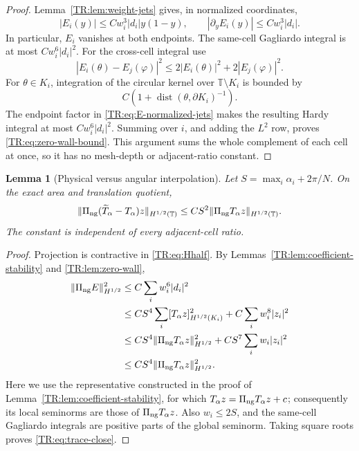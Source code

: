 \documentclass[11pt]{amsart}
\numberwithin{equation}{section}
\newtheorem{lemma}[theorem]{Lemma}
\theoremstyle{definition}
\theoremstyle{remark}
\newcommand{\T}{\mathbb T}
\newcommand{\PiNG}{\Pi_{\rm ng}}
\begin{document}
\begin{proof}
Lemma~\ref{TR:lem:weight-jets} gives, in normalized coordinates,
\begin{equation}\label{TR:eq:E-normalized-jets}
 |E_i(y)|\le Cw_i^3|d_i|y(1-y),
 \qquad
 |\partial_yE_i(y)|\le Cw_i^3|d_i|.
\end{equation}
In particular, $E_i$ vanishes at both endpoints.  The same-cell
Gagliardo integral is at most $Cw_i^6|d_i|^2$.  For the cross-cell
integral use
\begin{equation*}
 |E_i(\theta)-E_j(\varphi)|^2
 \le2|E_i(\theta)|^2+2|E_j(\varphi)|^2.
\end{equation*}
For $\theta\in K_i$, integration of the circular kernel over
$\T\setminus K_i$ is bounded by
\begin{equation*}
 C\left(1+\operatorname {dist}(\theta,\partial K_i)^{-1}\right).
\end{equation*}
The endpoint factor in \eqref{TR:eq:E-normalized-jets} makes the resulting
Hardy integral at most $Cw_i^6|d_i|^2$.  Summing over $i$, and adding the
$L^2$ row, proves \eqref{TR:eq:zero-wall-bound}.  This argument sums the
whole complement of each cell at once, so it has no mesh-depth or
adjacent-ratio constant.
\end{proof}

\begin{lemma}[Physical versus angular interpolation]
\label{TR:lem:trace-close}
Let $S=\max_i\alpha_i+2\pi/N$.  On the exact area and translation
quotient,
\begin{equation}\label{TR:eq:trace-close}
 \|\PiNG(\widetilde T_\alpha-T_\alpha)z\|_{H^{1/2}(\T)}
 \le CS^2\|\PiNG T_\alpha z\|_{H^{1/2}(\T)}.
\end{equation}
The constant is independent of every adjacent-cell ratio.
\end{lemma}

\begin{proof}
Projection is contractive in \eqref{TR:eq:Hhalf}.  By
Lemmas~\ref{TR:lem:coefficient-stability} and \ref{TR:lem:zero-wall},
\begin{align*}
 \|\PiNG E\|_{H^{1/2}}^2
 &\le C\sum_iw_i^6|d_i|^2\\
 &\le CS^4\sum_i[T_\alpha z]_{H^{1/2}(K_i)}^2
   +C\sum_iw_i^8|z_i|^2\\
 &\le CS^4\|\PiNG T_\alpha z\|_{H^{1/2}}^2
   +CS^7\sum_iw_i|z_i|^2\\
 &\le CS^4\|\PiNG T_\alpha z\|_{H^{1/2}}^2.
\end{align*}
Here we use the representative constructed in the proof of
Lemma~\ref{TR:lem:coefficient-stability}, for which
$T_\alpha z=\PiNG T_\alpha z+c$; consequently its local seminorms are
those of $\PiNG T_\alpha z$.  Also $w_i\le2S$, and the same-cell
Gagliardo integrals are positive parts of the global seminorm.  Taking square roots proves
\eqref{TR:eq:trace-close}.
\end{proof}
\end{document}
